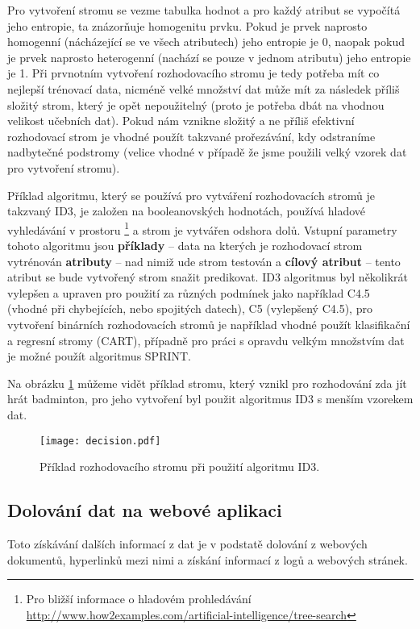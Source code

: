 \par Pro vytvoření stromu se vezme tabulka hodnot a pro každý atribut se vypočítá jeho entropie, ta znázorňuje homogenitu prvku. Pokud je prvek naprosto homogenní (nácházející se ve všech atributech) jeho entropie je 0, naopak pokud je prvek naprosto heterogenní (nachází se pouze v jednom atributu) jeho entropie je 1. Při prvnotním vytvoření rozhodovacího stromu je tedy potřeba mít co nejlepší trénovací data, nicméně velké množství dat může mít za následek příliš složitý strom, který je opět nepoužitelný (proto je potřeba dbát na vhodnou velikost učebních dat). Pokud nám vznikne složitý a ne příliš efektivní rozhodovací strom je vhodné použít takzvané prořezávání, kdy odstraníme nadbytečné podstromy (velice vhodné v případě že jsme použili velký vzorek dat pro vytvoření stromu).

\par Příklad algoritmu, který se používá pro vytváření rozhodovacích stromů je takzvaný ID3, je založen na booleanovských hodnotách, používá hladové vyhledávání v prostoru \footnote{Pro bližší informace o hladovém prohledávání \url{http://www.how2examples.com/artificial-intelligence/tree-search}} a strom je vytvářen odshora dolů. Vstupní parametry tohoto algoritmu jsou \textbf{příklady} -- data na kterých je rozhodovací strom vytrénován \textbf{atributy} -- nad nimiž ude strom testován a \textbf{cílový atribut} -- tento atribut se bude vytvořený strom snažit predikovat. ID3 algoritmus byl několikrát vylepšen a upraven pro použití za různých podmínek jako například C4.5 (vhodné při chybejících, nebo spojitých datech), C5 (vylepšený C4.5), pro vytvoření binárních rozhodovacích stromů je například vhodné použít klasifikační a regresní stromy (CART), případně pro práci s opravdu velkým množstvím dat je možné použít algoritmus SPRINT.

\par Na obrázku \ref{decision-tree} můžeme vidět příklad stromu, který vznikl pro rozhodování zda jít hrát badminton, pro jeho vytvoření byl použit algoritmus ID3 s menším vzorekem dat.
\begin{figure}[htp]
  \centering
  \texttt{[image: decision.pdf]}
  \caption{Příklad rozhodovacího stromu při použití algoritmu ID3.}
  \label{decision-tree}
\end{figure}


\subsection{Dolování dat na webové aplikaci}
\par Toto získávání dalších informací z dat je v podstatě dolování z webových dokumentů, hyperlinků mezi nimi a získání informací z logů a webových stránek. \cite{minigbook}

